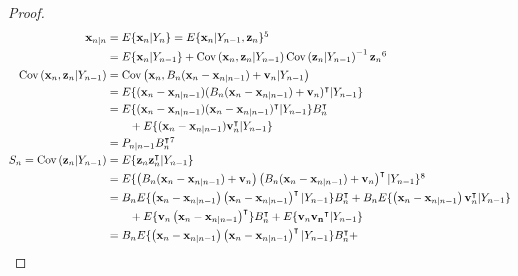 \begin{proof}
    \begin{align}
        \mathbf{x}_{n|n}&=E\{\mathbf{x}_n|Y_n\}=E\{\mathbf{x}_n|Y_{n-1},\mathbf{z}_n\}\footnotemark[5]\nonumber\\
                        &=E\{\mathbf{x}_n|Y_{n-1}\}+\text{Cov}\left(\mathbf{x}_n,\mathbf{z}_n|Y_{n-1}\right)\text{Cov}\left(\mathbf{z}_n|Y_{n-1}\right)^{-1}\mathbf{z}_n\footnotemark[6]\label{eq:xtGtTmp}\\
        \text{Cov}\left(\mathbf{x}_n,\mathbf{z}_n|Y_{n-1}\right)&=\text{Cov}\left(\mathbf{x}_n,B_n(\mathbf{x}_n-\mathbf{x}_{n|n-1})+\mathbf{v}_n|Y_{n-1}\right)\nonumber\\
                                                                &=E\{(\mathbf{x}_n-\mathbf{x}_{n|n-1})(B_n(\mathbf{x}_n-\mathbf{x}_{n|n-1})+\mathbf{v}_n)^\intercal|Y_{n-1}\}\nonumber\\
                                                                &=E\{(\mathbf{x}_n-\mathbf{x}_{n|n-1})(\mathbf{x}_n-\mathbf{x}_{n|n-1})^\intercal|Y_{n-1}\}B_n^\intercal\nonumber\\
                                                                &\qquad +E\{(\mathbf{x}_n-\mathbf{x}_{n|n-1})\mathbf{v}_n^\intercal|Y_{n-1}\}\nonumber\\
                                                                &=P_{n|n-1}B_n^\intercal\footnotemark[7]\label{eq:covXZ}\\
        S_n=\text{Cov}\left(\mathbf{z}_n|Y_{n-1}\right)&=E\{\mathbf{z}_n\mathbf{z}_n^\intercal|Y_{n-1}\}\nonumber\\
                                                       &=E\{\left(B_n(\mathbf{x}_n-\mathbf{x}_{n|n-1})+\mathbf{v}_n\right)\left(B_n(\mathbf{x}_n-\mathbf{x}_{n|n-1})+\mathbf{v}_n\right)^\intercal|Y_{n-1}\}\footnotemark[8]\nonumber\\
                                                       &=B_nE\{\left(\mathbf{x}_n-\mathbf{x}_{n|n-1}\right)\left(\mathbf{x}_n-\mathbf{x}_{n|n-1}\right)^\intercal|Y_{n-1}\}B_n^\intercal+B_nE\{\left(\mathbf{x}_n-\mathbf{x}_{n|n-1}\right)\mathbf{v}_n^\intercal|Y_{n-1}\}\nonumber\\
                                                       &\qquad +E\{\mathbf{v}_n\left(\mathbf{x}_n-\mathbf{x}_{n|n-1}\right)^\intercal\}B_n^\intercal+E\{\mathbf{v}_n\mathbf{v_n}^\intercal|Y_{n-1}\}\nonumber\\
                                                       &=B_nE\{\left(\mathbf{x}_n-\mathbf{x}_{n|n-1}\right)\left(\mathbf{x}_n-\mathbf{x}_{n|n-1}\right)^\intercal|Y_{n-1}\}B_n^\intercal+\nonumber\\

\end{align}
\end{proof}
